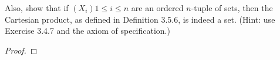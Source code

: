 \documentclass[../../main.tex]{subfiles}
\begin{document}
\begin{q}
    Also, show that if $(X_i){1 \leq i \leq n}$ are an ordered $n$-tuple of sets, then the Cartesian product, as defined in Definition 3.5.6, is indeed a set. (Hint: use Exercise 3.4.7 and the axiom of specification.)
\end{q}

\begin{proof}

\end{proof}
\begin{xx}
    
\end{xx}

\addtocounter{subsection}{1}
\subsection{}
\end{document}

